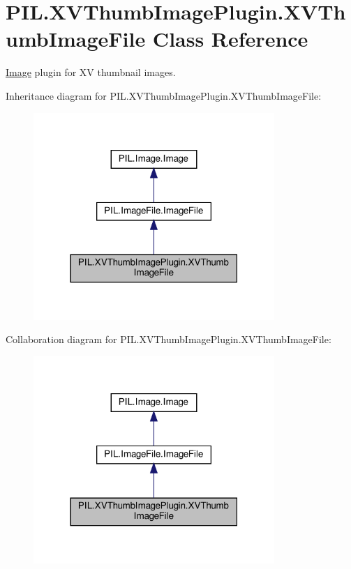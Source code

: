 \hypertarget{classPIL_1_1XVThumbImagePlugin_1_1XVThumbImageFile}{}\section{P\+I\+L.\+X\+V\+Thumb\+Image\+Plugin.\+X\+V\+Thumb\+Image\+File Class Reference}
\label{classPIL_1_1XVThumbImagePlugin_1_1XVThumbImageFile}


\hyperlink{namespacePIL_1_1Image}{Image} plugin for XV thumbnail images.  




Inheritance diagram for P\+I\+L.\+X\+V\+Thumb\+Image\+Plugin.\+X\+V\+Thumb\+Image\+File\+:
\nopagebreak
\begin{figure}[H]
\begin{center}
\leavevmode
\includegraphics[width=259pt]{classPIL_1_1XVThumbImagePlugin_1_1XVThumbImageFile__inherit__graph}
\end{center}
\end{figure}


Collaboration diagram for P\+I\+L.\+X\+V\+Thumb\+Image\+Plugin.\+X\+V\+Thumb\+Image\+File\+:
\nopagebreak
\begin{figure}[H]
\begin{center}
\leavevmode
\includegraphics[width=259pt]{classPIL_1_1XVThumbImagePlugin_1_1XVThumbImageFile__coll__graph}
\end{center}
\end{figure}
